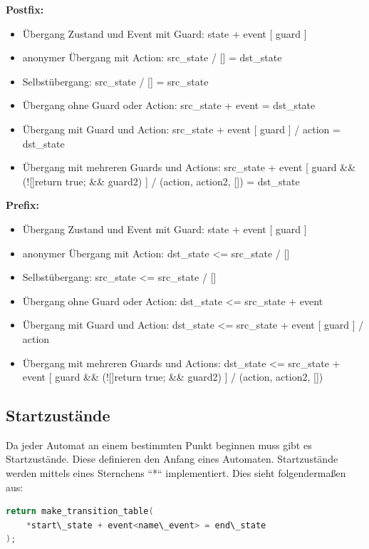 \documentclass{report}
\begin{document}
\textbf{Postfix:}
\begin{itemize}
    \item Übergang Zustand und Event mit Guard: \newline state + event [ guard ]
    \item anonymer Übergang mit Action: \newline src\_state / [] {} = dst\_state
    \item Selbstübergang: \newline src\_state / [] {} = src\_state
    \item Übergang ohne Guard oder Action: \newline src\_state + event = dst\_state
    \item Übergang mit Guard und Action: \newline src\_state + event [ guard ] / action = dst\_state	
    \item Übergang mit mehreren Guards und Actions: \newline src\_state + event [ guard \&\& (![]{return true;} \&\& guard2) ] / (action, action2, []{}) = dst\_state	
\end{itemize}

\textbf{Prefix:}
\begin{itemize}
    \item Übergang Zustand und Event mit Guard: \newline state + event [ guard ]
    \item anonymer Übergang mit Action: \newline dst\_state <= src\_state / [] {}
    \item Selbstübergang: \newline src\_state <= src\_state / [] {}
    \item Übergang ohne Guard oder Action: \newline dst\_state <= src\_state + event
    \item Übergang mit Guard und Action: \newline dst\_state <= src\_state + event [ guard ] / action
    \item Übergang mit mehreren Guards und Actions: \newline dst\_state <= src\_state + event [ guard \&\& (![]{return true;} \&\& guard2) ] / (action, action2, []{})
\end{itemize}

\subsection{Startzustände}
Da jeder Automat an einem bestimmten Punkt beginnen muss gibt es Startzustände. Diese definieren den Anfang eines Automaten. Startzustände werden mittels eines Sternchens ``*`` implementiert. Dies sieht folgendermaßen aus:
\begin{lstlisting}[language=C++]
return make_transition_table(
    *start\_state + event<name\_event> = end\_state
);
\end{lstlisting}
\end{document}
